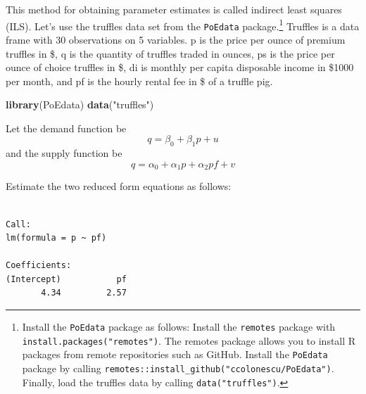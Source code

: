 \documentclass[]{book}
\newenvironment{Shaded}{\begin{snugshade}}{\end{snugshade}}
\newcommand{\KeywordTok}[1]{\textcolor[rgb]{0.13,0.29,0.53}{\textbf{#1}}}
\newcommand{\NormalTok}[1]{#1}
\newcommand{\OperatorTok}[1]{\textcolor[rgb]{0.81,0.36,0.00}{\textbf{#1}}}
\newcommand{\StringTok}[1]{\textcolor[rgb]{0.31,0.60,0.02}{#1}}
\let\rmarkdownfootnote\footnote%
\def\footnote{\protect\rmarkdownfootnote}
\begin{document}
This method for obtaining parameter estimates is called indirect least squares (ILS). Let's use the truffles data set from the \texttt{PoEdata} package.\footnote{Install the \texttt{PoEdata} package as follows: Install the \texttt{remotes} package with \texttt{install.packages("remotes")}. The remotes package allows you to install R packages from remote repositories such as GitHub. Install the \texttt{PoEdata} package by calling \texttt{remotes::install\_github("ccolonescu/PoEdata")}. Finally, load the truffles data by calling \texttt{data("truffles")}.} Truffles is a data frame with 30 observations on 5 variables. p is the price per ounce of premium truffles in \$, q is the quantity of truffles traded in ounces, ps is the price per ounce of choice truffles in \$, di is monthly per capita disposable income in \$1000 per month, and pf is the hourly rental fee in \$ of a truffle pig.

\begin{Shaded}
\begin{Highlighting}[]
\KeywordTok{library}\NormalTok{(PoEdata)}
\KeywordTok{data}\NormalTok{(}\StringTok{"truffles"}\NormalTok{)}
\end{Highlighting}
\end{Shaded}

Let the demand function be \[q=\beta_0+\beta_1p+u\] and the supply function be \[q=\alpha_0+\alpha_1p+\alpha_2pf+v\]

Estimate the two reduced form equations as follows:

\begin{Shaded}
\end{Shaded}

\begin{verbatim}

Call:
lm(formula = p ~ pf)

Coefficients:
(Intercept)           pf  
       4.34         2.57  
\end{verbatim}

\begin{Shaded}
\end{Shaded}
\end{document}
